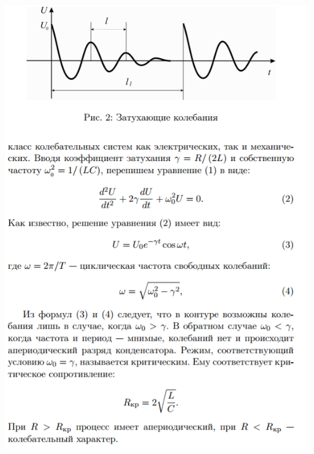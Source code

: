 \documentclass[12pt]{article}
\begin{document}
\begin{center}
       	\includegraphics[width=15cm]{theory4.png}

\end{center}
\end{document}
